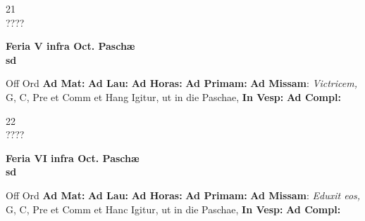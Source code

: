 \documentclass[10pt, openany]{book}
\begin{document}
    \begin{center}
        \begin{minipage}{3.5in}
            \vspace{2em}
            \begin{minipage}{0.5in}
                {\Huge 21} \\
                {\normalsize ????}
            \end{minipage}
            \begin{minipage}{3.0in}
                \textbf{ \large Feria V infra Oct. Paschæ \\
                \textnormal{\normalsize sd}}

            \end{minipage}
            \begin{justify}Off Ord
                \textbf{Ad Mat: }
                \textbf{Ad Lau: }
                \textbf{Ad Horas: }
                \textbf{Ad Primam: }\textbf{Ad Missam}: \textit{Victricem,} G, C, Pre et Comm et Hang Igitur, ut in die Paschae, 
                \textbf{In Vesp: }
                \textbf{Ad Compl: }
            \end{justify}
        \end{minipage}
    \end{center}

    \begin{center}
        \begin{minipage}{3.5in}
            \vspace{2em}
            \begin{minipage}{0.5in}
                {\Huge 22} \\
                {\normalsize ????}
            \end{minipage}
            \begin{minipage}{3.0in}
                \textbf{ \large Feria VI infra Oct. Paschæ \\
                \textnormal{\normalsize sd}}

            \end{minipage}
            \begin{justify}Off Ord
                \textbf{Ad Mat: }
                \textbf{Ad Lau: }
                \textbf{Ad Horas: }
                \textbf{Ad Primam: }\textbf{Ad Missam}: \textit{Eduxit eos,} G, C, Pre et Comm et Hanc Igitur, ut in die Paschae, 
                \textbf{In Vesp: }
                \textbf{Ad Compl: }
            \end{justify}
        \end{minipage}
    \end{center}
\end{document}
